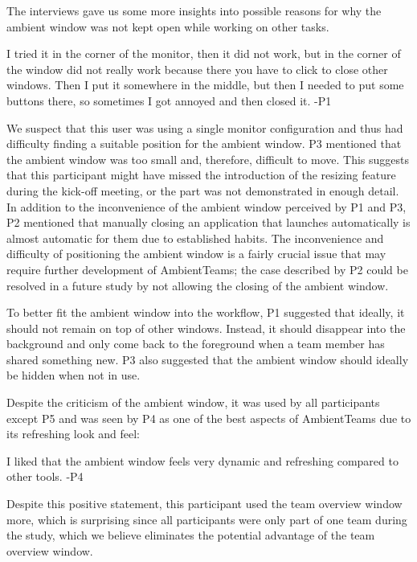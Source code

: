 The interviews gave us some more insights into possible reasons for why the ambient window was not kept open while working on other tasks.

\begin{displayquote}
    I tried it in the corner of the monitor, then it did not work, but in the corner of the window did not really work because there you have to click to close other windows. Then I put it somewhere in the middle, but then I needed to put some buttons there, so sometimes I got annoyed and then closed it. -P1
\end{displayquote}

We suspect that this user was using a single monitor configuration and thus had difficulty finding a suitable position for the ambient window. P3 mentioned that the ambient window was too small and, therefore, difficult to move. This suggests that this participant might have missed the introduction of the resizing feature during the kick-off meeting, or the part was not demonstrated in enough detail. In addition to the inconvenience of the ambient window perceived by P1 and P3, P2 mentioned that manually closing an application that launches automatically is almost automatic for them due to established habits. The inconvenience and difficulty of positioning the ambient window is a fairly crucial issue that may require further development of AmbientTeams; the case described by P2 could be resolved in a future study by not allowing the closing of the ambient window.

To better fit the ambient window into the workflow, P1 suggested that ideally, it should not remain on top of other windows. Instead, it should disappear into the background and only come back to the foreground when a team member has shared something new. P3 also suggested that the ambient window should ideally be hidden when not in use.

Despite the criticism of the ambient window, it was used by all participants except P5 and was seen by P4 as one of the best aspects of AmbientTeams due to its refreshing look and feel:

\begin{displayquote}
    I liked that the ambient window feels very dynamic and refreshing compared to other tools. -P4
\end{displayquote}

Despite this positive statement, this participant used the team overview window more, which is surprising since all participants were only part of one team during the study, which we believe eliminates the potential advantage of the team overview window. 

